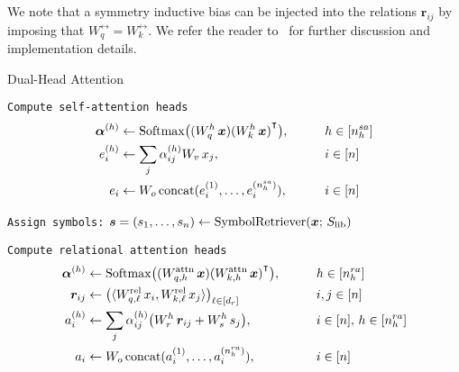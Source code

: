 We note that a symmetry inductive bias can be injected into the relations $\bm{r}_{ij}$ by imposing that $W_{q}^{\rel} = W_k^{\rel}$. We refer the reader to~ for further discussion and implementation details.


\begin{algorithm}[ht!]
	\caption{Dual-Head Attention}\label{alg:dual_head_attn}

    \vspace{1em}

    \texttt{Compute self-attention heads}
    \begin{align*}
        \bm{\alpha}^{(h)} &\gets \mathrm{Softmax}\big({(W_q^h\, \bm{x})} {(W_k^h\, \bm{x})}^\intercal\big), \qquad && h \in [n_h^{sa}] \\
        e_i^{(h)} &\gets \sum_{j} \alpha_{ij}^{(h)} W_v\, x_j, \qquad && i \in [n]\\
        e_i &\gets W_o \, \mathrm{concat}(e_i^{(1)}, \ldots, e_i^{(n_h^{sa})}), && i \in [n]
    \end{align*}

    \texttt{Assign symbols:} $\bm{s} = (s_1, \ldots, s_n) \gets \mathrm{SymbolRetriever}(\bm{x};\,S_\mathrm{lib})$

    \texttt{Compute relational attention heads}
    \begin{align*}
        \bm{\alpha}^{(h)} &\gets \mathrm{Softmax}\big({(W_{q, h}^{\mathrm{attn}}\, \bm{x})} {(W_{k, h}^{\mathrm{attn}}\, \bm{x})}^\intercal\big), \qquad && h \in [n_h^{ra}] \\
        \bm{r}_{ij} &\gets \big(\langle W_{q, \ell}^{\mathrm{rel}}\, x_i, W_{k, \ell}^{\mathrm{rel}}\, x_j \rangle\big)_{\ell \in [d_r]} \qquad && i,j \in [n] \\
        a_i^{(h)} &\gets \sum_{j} \alpha_{ij}^{(h)} \big(W_r^h \, \bm{r}_{ij} + W_s^{h}\, s_j\big), \qquad && i \in [n],\, h \in [n_h^{ra}]\\
        a_i &\gets W_o \, \mathrm{concat}(a_i^{(1)}, \ldots, a_i^{(n_h^{ra})}), && i \in [n]
    \end{align*}


\end{algorithm}

